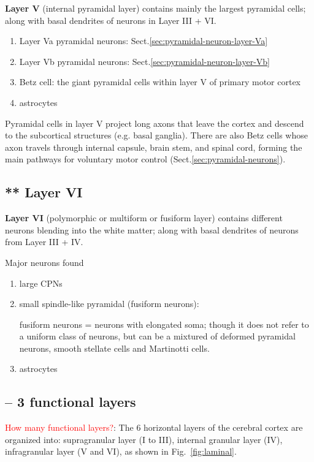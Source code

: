 {\bf Layer V} (internal pyramidal layer) contains mainly the largest pyramidal
cells; along with basal dendrites of neurons in Layer III + VI.
\begin{enumerate}
  \item Layer Va pyramidal neurons: Sect.\ref{sec:pyramidal-neuron-layer-Va}
  \item Layer Vb pyramidal neurons: Sect.\ref{sec:pyramidal-neuron-layer-Vb}
  
  \item Betz cell: the giant pyramidal cells within layer V of primary
motor cortex
  \item astrocytes
\end{enumerate}

Pyramidal cells in layer V project long axons that leave the cortex and descend
to the subcortical structures (e.g.  basal ganglia). There are also Betz cells
whose axon travels through internal capsule, brain stem, and spinal cord,
forming the main pathways for voluntary motor control
(Sect.\ref{sec:pyramidal-neurons}).

\subsection{** Layer VI}
\label{sec:layer-VI}

{\bf Layer VI} (polymorphic or multiform or fusiform layer) contains different
neurons blending into the white matter; along with basal dendrites of
neurons from Layer III +  IV.

Major neurons found
\begin{enumerate}
  \item large CPNs
  \item small spindle-like pyramidal (fusiform neurons):
  
fusiform neurons = neurons with elongated soma; though it does not refer to a
uniform class of neurons, but can be a mixtured of deformed pyramidal neurons,
smooth stellate cells and Martinotti cells.
  
  \item astrocytes
\end{enumerate}


\subsection{-- 3 functional layers}
\label{sec:layered_structure-functional}

\textcolor{red}{How many functional layers?}: The 6 horizontal layers of the
cerebral cortex are organized into: supragranular layer (I to III), internal
granular layer (IV), infragranular layer (V and VI), as shown in Fig.~\ref{fig:laminal}.

